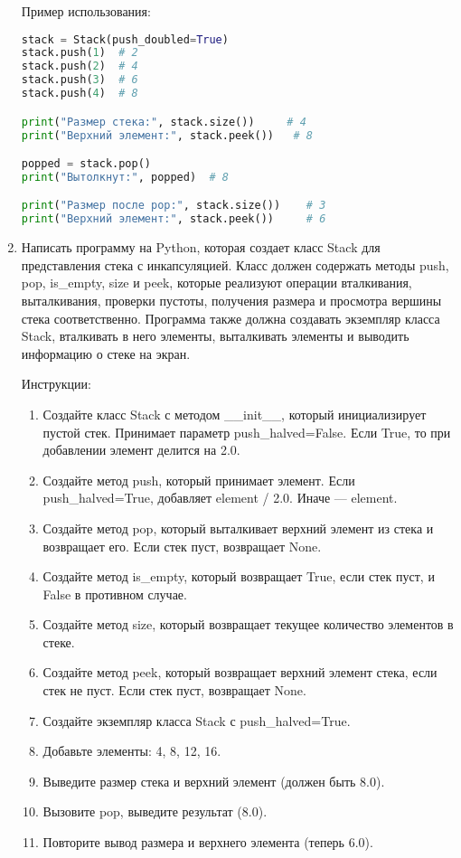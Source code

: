\begin{enumerate}
Пример использования:
\begin{lstlisting}[language=Python]
stack = Stack(push_doubled=True)
stack.push(1)  # 2
stack.push(2)  # 4
stack.push(3)  # 6
stack.push(4)  # 8

print("Размер стека:", stack.size())     # 4
print("Верхний элемент:", stack.peek())   # 8

popped = stack.pop()
print("Вытолкнут:", popped)  # 8

print("Размер после pop:", stack.size())    # 3
print("Верхний элемент:", stack.peek())     # 6
\end{lstlisting}

\item Написать программу на Python, которая создает класс Stack для представления стека с инкапсуляцией. Класс должен содержать методы push, pop, is\_empty, size и peek, которые реализуют операции вталкивания, выталкивания, проверки пустоты, получения размера и просмотра вершины стека соответственно. Программа также должна создавать экземпляр класса Stack, вталкивать в него элементы, выталкивать элементы и выводить информацию о стеке на экран.

Инструкции:
\begin{enumerate}
    \item Создайте класс Stack с методом \_\_init\_\_, который инициализирует пустой стек. Принимает параметр push\_halved=False. Если True, то при добавлении элемент делится на 2.0.
    \item Создайте метод push, который принимает элемент. Если push\_halved=True, добавляет element / 2.0. Иначе — element.
    \item Создайте метод pop, который выталкивает верхний элемент из стека и возвращает его. Если стек пуст, возвращает None.
    \item Создайте метод is\_empty, который возвращает True, если стек пуст, и False в противном случае.
    \item Создайте метод size, который возвращает текущее количество элементов в стеке.
    \item Создайте метод peek, который возвращает верхний элемент стека, если стек не пуст. Если стек пуст, возвращает None.
    \item Создайте экземпляр класса Stack с push\_halved=True.
    \item Добавьте элементы: 4, 8, 12, 16.
    \item Выведите размер стека и верхний элемент (должен быть 8.0).
    \item Вызовите pop, выведите результат (8.0).
    \item Повторите вывод размера и верхнего элемента (теперь 6.0).
\end{enumerate}


\end{enumerate}
